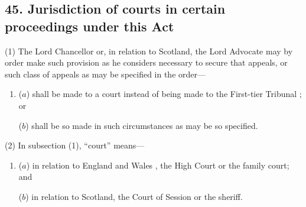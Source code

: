 \documentclass[12pt,a4paper]{article}
\begin{document}
\subsection{45. Jurisdiction of courts in certain proceedings under this Act}

(1) The Lord Chancellor or, in relation to Scotland, the Lord Advocate may by order make such provision as he considers necessary to secure that appeals, or such class of appeals as may be specified in the order—
\begin{enumerate}\item[]
($a$) shall be made to a court instead of being made to 
the First-tier Tribunal%
; or

($b$) shall be so made in such circumstances as may be so specified.
\end{enumerate}

(2) In subsection (1), “court” means—
\begin{enumerate}\item[]
($a$) in relation to England and Wales%
, the High Court or the family court; and  %

($b$) in relation to Scotland, the Court of Session or the sheriff.
\end{enumerate}

%
%
%
\end{document}
